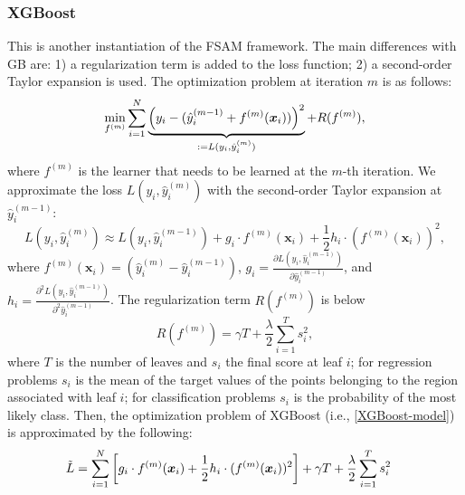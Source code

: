 {    \subsubsection{XGBoost}
        This is another instantiation of the FSAM framework.
        The main differences with GB are: 1) a regularization term is added to the loss function; 2) a second-order Taylor expansion is used. 
        The optimization problem at iteration $m$ is as follows:
            \begin{equation}\label{XGBoost-model}
                \min_{f^{(m)}} \sum_{i=1}^{N}{
                    \underbrace{\left( y_i - (\hat{y}^{(m-1)}_i + f^{(m)}(\bm{x}_i)) \right)^2}_{:=L(y_i, \hat{y}_i^{(m)}) } + R(f^{(m)}),
                }
            \end{equation}
        where $f^{(m)}$ is the learner that needs to be learned at the $m$-th iteration.
        We approximate the loss $L(y_i, \hat{y}_i^{(m)})$ with the second-order Taylor expansion at $\hat{y}^{(m-1)}_i$:
            \begin{equation}
                L(y_i, \hat{y}_i^{(m)}) \approx L(y_i, \hat{y}^{(m-1)}_i) + g_i \cdot f^{(m)}(\bm{x}_i) + \frac{1}{2} h_i \cdot (f^{(m)}(\bm{x}_i))^2,
            \end{equation}
        where $f^{(m)}(\bm{x}_i) = (\hat{y}_i^{(m)} - \hat{y}_i^{(m-1)})$, $g_i = \frac{\partial L(y_i, \hat{y}_i^{(m-1)})}{\partial \hat{y}_i^{(m-1)} }$, and $h_i = \frac{\partial^2 L(y_i, \hat{y}_i^{(m-1)})}{\partial^2 \hat{y}_i^{(m-1)} }$.
        The regularization term $R(f^{(m)})$ is below
            \begin{equation}
                R(f^{(m)}) = \gamma T + \frac{\lambda}{2}\sum_{i=1}^{T}{s_i^2},
            \end{equation}
        where $T$ is the number of leaves and $s_i$ the final score at leaf $i$; for regression problems $s_i$ is the mean of the target values of the points belonging to the region associated with leaf $i$; for classification problems $s_i$ is the probability of the most likely class.
        Then, the optimization problem of XGBoost (i.e., \eqref{XGBoost-model}) is approximated by the following:
            \begin{equation}
                \begin{aligned}
                    \tilde{L} & = \sum_{i=1}^{N}{
                        \left[
                            g_i \cdot f^{(m)}(\bm{x}_i) + \frac{1}{2} h_i \cdot (f^{(m)}(\bm{x}_i))^2 
                        \right] + \gamma T + \frac{\lambda}{2}\sum_{i=1}^{T}{s_i^2}
}
\end{aligned}
\end{equation}}
